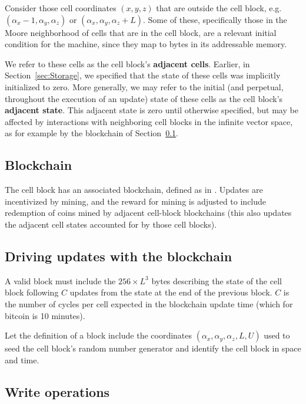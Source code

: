 \documentclass{article}
\begin{document}
Consider those cell coordinates $(x,y,z)$ that are outside the cell block,
e.g. $(\alpha_x-1,\alpha_y,\alpha_z)$ or  $(\alpha_x,\alpha_y,\alpha_z + L)$.
Some of these, specifically those in the Moore neighborhood of cells that are in the cell block,
are a relevant initial condition for the machine,
since they map to bytes in its addressable memory.

We refer to these cells as the cell block's {\bf adjacent cells}.
Earlier, in Section~\ref{sec:Storage}, we specified that the state of these cells was implicitly initialized to zero.
More generally, we may refer to the initial (and perpetual, throughout the execution of an update)
state of these cells as the cell block's {\bf adjacent state}.
This adjacent state is zero until otherwise specified, but may be affected
by interactions with neighboring cell blocks in the infinite vector space,
as for example by the blockchain of Section~\ref{sec:Blockchain}.

\subsection{Blockchain}
\label{sec:Blockchain}

The cell block has an associated blockchain, defined as in \cite{Nakamoto2008}.
Updates are incentivized by mining,
and the reward for mining is adjusted to include redemption of coins mined by adjacent cell-block blockchains
(this also updates the adjacent cell states accounted for by those cell blocks).

\subsection{Driving updates with the blockchain}
\label{sec:ProofOfWork}

A valid block must include the $256 \times L^3$ bytes describing the state of the cell block following $C$ updates
from the state at the end of the previous block.
$C$ is the number of cycles per cell expected in the blockchain update time
(which for bitcoin is 10 minutes).

Let the definition of a block include the coordinates $(\alpha_x,\alpha_y,\alpha_z,L,U)$
used to seed the cell block's random number generator and identify the cell block in space and time.

\subsection{Write operations}
\end{document}
